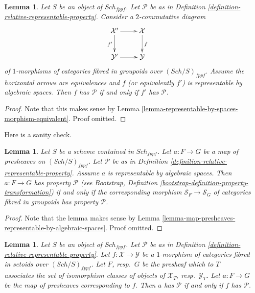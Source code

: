 \documentclass{stacks-project}
\theoremstyle{plain}
\newtheorem{lemma}[subsection]{Lemma}
\theoremstyle{definition}
\theoremstyle{remark}
\numberwithin{equation}{subsection}
\def\Sch{\mathit{Sch}}
\begin{document}
\begin{lemma}
\label{lemma-property-morphism-equivalent}
Let $S$ be an object of $\Sch_{fppf}$.
Let $\mathcal{P}$ be as in
Definition \ref{definition-relative-representable-property}.
Consider a $2$-commutative diagram
$$
\xymatrix{
\mathcal{X}' \ar[r] \ar[d]_{f'} & \mathcal{X} \ar[d]^f \\
\mathcal{Y}' \ar[r] & \mathcal{Y}
}
$$
of $1$-morphisms of categories fibred in groupoids over
$(\Sch/S)_{fppf}$.
Assume the horizontal arrows are equivalences and $f$ (or equivalently $f'$)
is representable by algebraic spaces.
Then $f$ has $\mathcal{P}$ if and only if $f'$ has $\mathcal{P}$.
\end{lemma}

\begin{proof}
Note that this makes sense by
Lemma \ref{lemma-representable-by-spaces-morphism-equivalent}.
Proof omitted.
\end{proof}

\noindent
Here is a sanity check.

\begin{lemma}
\label{lemma-map-presheaves-representable-by-spaces-transformation-property}
Let $S$ be a scheme contained in $\Sch_{fppf}$.
Let $a : F \to G$ be a map of presheaves on $(\Sch/S)_{fppf}$.
Let $\mathcal{P}$ be as in
Definition \ref{definition-relative-representable-property}.
Assume $a$ is representable by algebraic spaces.
Then $a : F \to G$ has property $\mathcal{P}$ (see
Bootstrap, Definition \ref{bootstrap-definition-property-transformation})
if and only if the corresponding morphism
$\mathcal{S}_F \to \mathcal{S}_G$ of categories fibred in groupoids
has property $\mathcal{P}$.
\end{lemma}

\begin{proof}
Note that the lemma makes sense by
Lemma \ref{lemma-map-presheaves-representable-by-algebraic-spaces}.
Proof omitted.
\end{proof}

\begin{lemma}
\label{lemma-map-fibred-setoids-property}
Let $S$ be an object of $\Sch_{fppf}$. Let $\mathcal{P}$ be as in
Definition \ref{definition-relative-representable-property}.
Let $f : \mathcal{X} \to \mathcal{Y}$ be a $1$-morphism of
categories fibred in setoids over $(\Sch/S)_{fppf}$.
Let $F$, resp.\ $G$ be the presheaf which to $T$ associates
the set of isomorphism classes of objects of
$\mathcal{X}_T$, resp.\ $\mathcal{Y}_T$.
Let $a : F \to G$ be the map of presheaves corresponding to $f$.
Then $a$ has $\mathcal{P}$ if and only if $f$ has $\mathcal{P}$.
\end{lemma}
\end{document}
